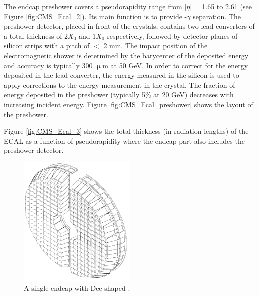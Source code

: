 The endcap preshower covers a pseudorapidity range from $|\eta|$ = 1.65 to 2.61 (see Figure \ref{fig:CMS_Ecal_2}). Its main function is to provide \pizero-$\gamma$ separation. The preshower detector, placed in front of the crystals, contains two lead converters of a total thickness of 2$X_{0}$ and 1$X_{0}$ respectively, followed by detector planes of silicon strips with a pitch of $<$ 2 mm. The impact position of the electromagnetic shower is determined by the barycenter of the deposited energy and accuracy is typically 300 $\upmu$m at 50 GeV. In order to correct for the energy deposited in the lead converter, the energy measured in the silicon is used to apply corrections to the energy measurement in the crystal. The fraction of energy deposited in the preshower (typically 5\% at 20 GeV) decreases with increasing incident energy. Figure \ref{fig:CMS_Ecal_preshower} shows the layout of the preshower.

Figure \ref{fig:CMS_Ecal_3} shows the total thickness (in radiation lengths) of the ECAL as a function of
pseudorapidity where the endcap part also includes the preshower detector.




\begin{figure}[h!]
\begin{center}
\includegraphics[width=0.5\textwidth]{figures/CMS/ECAL/cms_ecalEndcap.png}
\caption{A single endcap with Dee-shaped \cite{ECAL_TDR}.}
\label{fig:CMS_Ecal_endcap}
\end{center}
\end{figure}

